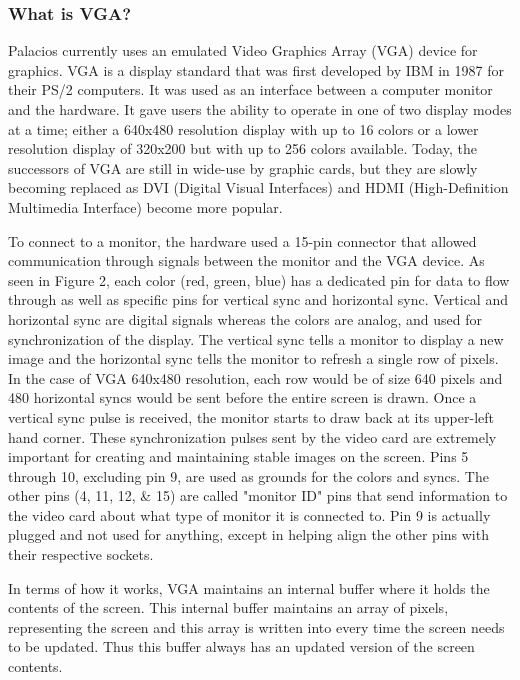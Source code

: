 \documentclass{acm_proc_article-sp}
\begin{document}
\subsubsection{What is VGA?}
Palacios currently uses an emulated Video Graphics Array (VGA) device for graphics. VGA is a display standard that was first developed by IBM in 1987 for their PS/2 computers. It was used as an interface between a computer monitor and the hardware. It gave users the ability to operate in one of two display modes at a time; either a 640x480  resolution display with up to 16 colors or a lower resolution display of 320x200 but with up to 256 colors available. Today, the successors of VGA are still in wide-use by graphic cards, but they are slowly becoming replaced as DVI (Digital Visual Interfaces) and HDMI (High-Definition Multimedia Interface) become more popular.
\par
To connect to a monitor, the hardware used a 15-pin connector that allowed communication through signals between the monitor and the VGA device. As seen in Figure 2, each color (red, green, blue) has a dedicated pin for data to flow through as well as specific pins for vertical sync and horizontal sync. Vertical and horizontal sync are digital signals whereas the colors are analog, and used for synchronization of the display. The vertical sync tells a monitor to display a new image and the horizontal sync tells the monitor to refresh a single row of pixels. In the case of VGA 640x480 resolution, each row would be of size 640 pixels and 480 horizontal syncs would be sent before the entire screen is drawn. Once a vertical sync pulse is received, the monitor starts to draw back at its upper-left hand corner. These synchronization pulses sent by the video card are extremely important for creating and maintaining stable images on the screen. Pins 5 through 10, excluding pin 9, are used as grounds for the colors and syncs. The other pins (4, 11, 12, \& 15) are called "monitor ID" pins that send information to the video card about what type of monitor it is connected to. Pin 9 is actually plugged and not used for anything, except in helping align the other pins with their respective sockets. 
\par
 In terms of how it works, VGA maintains an internal buffer where it holds the contents of the screen. This internal buffer maintains an array of pixels, representing the screen and this array is written into every time the screen needs to be updated. Thus this buffer always has an updated version of the screen contents.
 \par
\end{document}
